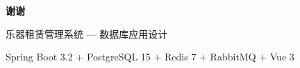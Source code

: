 \documentclass[aspectratio=169,10pt]{beamer}
\begin{document}
\begin{frame}
  \begin{center}
    \vspace{2cm}
    {\Huge \textbf{谢谢}}

    \vspace{1cm}
    {\large 乐器租赁管理系统 — 数据库应用设计}

    \vspace{0.5cm}
    {\small Spring Boot 3.2 + PostgreSQL 15 + Redis 7 + RabbitMQ + Vue 3}
  \end{center}
\end{frame}
\end{document}
